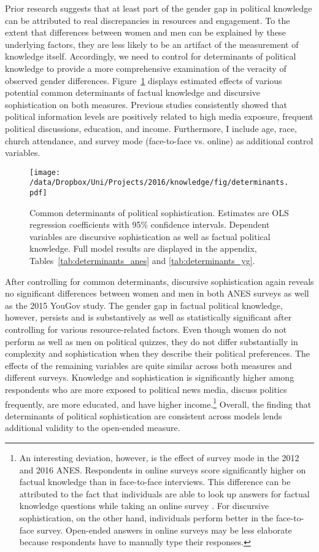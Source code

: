 Prior research suggests that at least part of the gender gap in political knowledge can be attributed to real discrepancies in resources and engagement. To the extent that differences between women and men can be explained by these underlying factors, they are less likely to be an artifact of the measurement of knowledge itself. Accordingly, we need to control for determinants of political knowledge to provide a more comprehensive examination of the veracity of observed gender differences. Figure~\ref{fig:determinants} displays estimated effects of various potential common determinants of factual knowledge and discursive sophistication on both measures. Previous studies consistently showed that political information levels are positively related to high media exposure, frequent political discussions, education, and income. Furthermore, I include age, race, church attendance, and survey mode (face-to-face vs. online) as additional control variables.

\begin{figure}[h]\centering
\texttt{[image: /data/Dropbox/Uni/Projects/2016/knowledge/fig/determinants.pdf]}
\caption[Common determinants of political sophistication]{Common determinants of political sophistication. Estimates are OLS regression coefficients with 95\% confidence intervals. Dependent variables are discursive sophistication as well as factual political knowledge. Full model results are displayed in the appendix, Tables~\ref{tab:determinants_anes} and \ref{tab:determinants_yg}.}\label{fig:determinants}
\end{figure}

After controlling for common determinants, discursive sophistication again reveals no significant differences between women and men in both ANES surveys as well as the 2015 YouGov study. The gender gap in factual political knowledge, however, persists and is substantively as well as statistically significant after controlling for various resource-related factors. Even though women do not perform as well as men on political quizzes, they do not differ substantially in complexity and sophistication when they describe their political preferences. The effects of the remaining variables are quite similar across both measures and different surveys. Knowledge and sophistication is significantly higher among respondents who are more exposed to political news media, discuss politics frequently, are more educated, and have higher income.\footnote{An interesting deviation, however, is the effect of survey mode in the 2012 and 2016 ANES. Respondents in online surveys score significantly higher on factual knowledge than in face-to-face interviews. This difference can be attributed to the fact that individuals are able to look up answers for factual knowledge questions while taking an online survey \citep[cf.][]{clifford2016cheating}. For discursive sophistication, on the other hand, individuals perform better in the face-to-face survey. Open-ended answers in online surveys may be less elaborate because respondents have to manually type their responses.} Overall, the finding that determinants of political sophistication are consistent across models lends additional validity to the open-ended measure.


